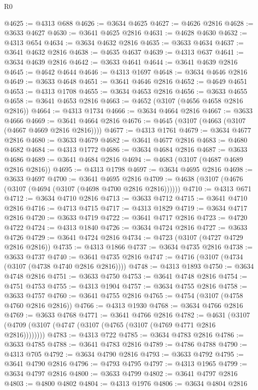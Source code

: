 \begin{lexlean}{R0}
\begin{coremodule}
@4625 := @4313 @688
@4626 := @3634 @4625
@4627 := @4626 @2816
@4628 := @3633 @4627
@4630 := @3641 @4625 @2816
@4631 := @4628 @4630
@4632 := @4313 @654
@4634 := @3634 @4632 @2816
@4635 := @3633 @4634
@4637 := @3641 @4632 @2816
@4638 := @4635 @4637
@4639 := @4313 @637
@4641 := @3634 @4639 @2816
@4642 := @3633 @4641
@4644 := @3641 @4639 @2816
@4645 := @4642 @4644
@4646 := @4313 @1697
@4648 := @3634 @4646 @2816
@4649 := @3633 @4648
@4651 := @3641 @4646 @2816
@4652 := @4649 @4651
@4653 := @4313 @1708
@4655 := @3634 @4653 @2816
@4656 := @3633 @4655
@4658 := @3641 @4653 @2816
@4663 := @4652 (@3107 (@4656 @4658 @2816 @2816))
@4664 := @4313 @1734
@4666 := @3634 @4664 @2816
@4667 := @3633 @4666
@4669 := @3641 @4664 @2816
@4676 := @4645 (@3107 (@4663 (@3107 (@4667 @4669 @2816 @2816))))
@4677 := @4313 @1761
@4679 := @3634 @4677 @2816
@4680 := @3633 @4679
@4682 := @3641 @4677 @2816
@4683 := @4680 @4682
@4684 := @4313 @1772
@4686 := @3634 @4684 @2816
@4687 := @3633 @4686
@4689 := @3641 @4684 @2816
@4694 := @4683 (@3107 (@4687 @4689 @2816 @2816))
@4695 := @4313 @1798
@4697 := @3634 @4695 @2816
@4698 := @3633 @4697
@4700 := @3641 @4695 @2816
@4709 := @4638 (@3107 (@4676 (@3107 (@4694 (@3107 (@4698 @4700 @2816 @2816))))))
@4710 := @4313 @671
@4712 := @3634 @4710 @2816
@4713 := @3633 @4712
@4715 := @3641 @4710 @2816
@4716 := @4713 @4715
@4717 := @4313 @1829
@4719 := @3634 @4717 @2816
@4720 := @3633 @4719
@4722 := @3641 @4717 @2816
@4723 := @4720 @4722
@4724 := @4313 @1840
@4726 := @3634 @4724 @2816
@4727 := @3633 @4726
@4729 := @3641 @4724 @2816
@4734 := @4723 (@3107 (@4727 @4729 @2816 @2816))
@4735 := @4313 @1866
@4737 := @3634 @4735 @2816
@4738 := @3633 @4737
@4740 := @3641 @4735 @2816
@4747 := @4716 (@3107 (@4734 (@3107 (@4738 @4740 @2816 @2816))))
@4748 := @4313 @1893
@4750 := @3634 @4748 @2816
@4751 := @3633 @4750
@4753 := @3641 @4748 @2816
@4754 := @4751 @4753
@4755 := @4313 @1904
@4757 := @3634 @4755 @2816
@4758 := @3633 @4757
@4760 := @3641 @4755 @2816
@4765 := @4754 (@3107 (@4758 @4760 @2816 @2816))
@4766 := @4313 @1930
@4768 := @3634 @4766 @2816
@4769 := @3633 @4768
@4771 := @3641 @4766 @2816
@4782 := @4631 (@3107 (@4709 (@3107 (@4747 (@3107 (@4765 (@3107 (@4769 @4771 @2816 @2816))))))))
@4783 := @4313 @722
@4785 := @3634 @4783 @2816
@4786 := @3633 @4785
@4788 := @3641 @4783 @2816
@4789 := @4786 @4788
@4790 := @4313 @705
@4792 := @3634 @4790 @2816
@4793 := @3633 @4792
@4795 := @3641 @4790 @2816
@4796 := @4793 @4795
@4797 := @4313 @1965
@4799 := @3634 @4797 @2816
@4800 := @3633 @4799
@4802 := @3641 @4797 @2816
@4803 := @4800 @4802
@4804 := @4313 @1976
@4806 := @3634 @4804 @2816

\end{coremodule}
\end{lexlean}
